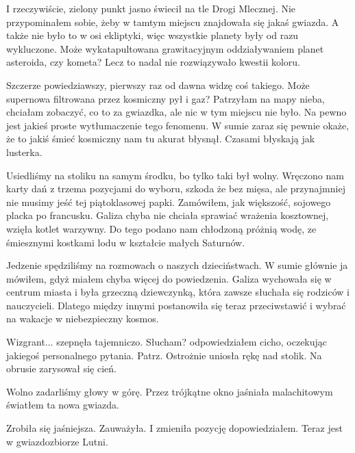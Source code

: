 I rzeczywiście, zielony punkt jasno świecił na tle Drogi Mlecznej.
Nie przypominałem sobie, żeby w tamtym miejscu znajdowała się jakaś gwiazda.
A także nie było to w osi ekliptyki, więc wszystkie planety były od razu wykluczone.
Może wykatapultowana grawitacyjnym oddziaływaniem planet asteroida, czy kometa?
Lecz to nadal nie rozwiązywało kwestii koloru.

\begin{dialogue}
	\ds{} Szczerze powiedziawszy, pierwszy raz od dawna widzę coś takiego. Może supernowa filtrowana przez kosmiczny pył i gaz?
	\ds{} Patrzyłam na mapy nieba, chciałam zobaczyć, co to za gwiazdka, ale nic w tym miejscu nie było.
	\ds{} Na pewno jest jakieś proste wytłumaczenie tego fenomenu. W sumie zaraz się pewnie okaże, że to jakiś śmieć kosmiczny nam tu akurat błysnął. Czasami błyskają jak lusterka.
\end{dialogue}

Usiedliśmy na stoliku na samym środku, bo tylko taki był wolny.
Wręczono nam karty dań z trzema pozycjami do wyboru, szkoda że bez mięsa, ale przynajmniej nie musimy jeść tej piątoklasowej papki.
Zamówiłem, jak większość, sojowego placka po francusku.
Galiza chyba nie chciała sprawiać wrażenia kosztownej, wzięła kotlet warzywny.
Do tego podano nam chłodzoną próżnią wodę, ze śmiesznymi kostkami lodu w kształcie małych Saturnów.

Jedzenie spędziliśmy na rozmowach o naszych dzieciństwach.
W sumie głównie ja mówiłem, gdyż miałem chyba więcej do powiedzenia.
Galiza wychowała się w centrum miasta i była grzeczną dziewczynką, która zawsze słuchała się rodziców i nauczycieli.
Dlatego między innymi postanowiła się teraz przeciwstawić i wybrać na wakacje w niebezpieczny kosmos.

\begin{dialogue}
	\ds{} Wizgrant... \dm{} szepnęła tajemniczo.
	\ds{} Słucham? \dm{} odpowiedziałem cicho, oczekując jakiegoś personalnego pytania.
	\ds{} Patrz. \dm{} Ostrożnie uniosła rękę nad stolik. Na obrusie zarysował się cień.
\end{dialogue}

Wolno zadarliśmy głowy w górę. Przez trójkątne okno jaśniała malachitowym światłem ta nowa gwiazda.

\begin{dialogue}
	\ds{} Zrobiła się jaśniejsza. \dm{} Zauważyła.
	\ds{} I zmieniła pozycję \dm{} dopowiedziałem. \dm{} Teraz jest w gwiazdozbiorze Lutni.
\end{dialogue}

